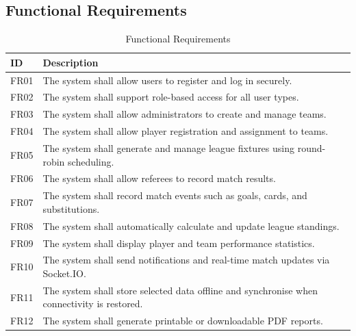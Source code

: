 \documentclass[12pt,a4paper]{report}
\begin{document}
\subsection{Functional Requirements}
\begin{table}[H]
\centering
\caption{Functional Requirements}
\begin{tabular}{p{2.5cm}p{11.5cm}}
\toprule
\textbf{ID} & \textbf{Description}\\
\midrule
FR01 & The system shall allow users to register and log in securely.\\
FR02 & The system shall support role-based access for all user types.\\
FR03 & The system shall allow administrators to create and manage teams.\\
FR04 & The system shall allow player registration and assignment to teams.\\
FR05 & The system shall generate and manage league fixtures using round-robin scheduling.\\
FR06 & The system shall allow referees to record match results.\\
FR07 & The system shall record match events such as goals, cards, and substitutions.\\
FR08 & The system shall automatically calculate and update league standings.\\
FR09 & The system shall display player and team performance statistics.\\
FR10 & The system shall send notifications and real-time match updates via Socket.IO.\\
FR11 & The system shall store selected data offline and synchronise when connectivity is restored.\\
FR12 & The system shall generate printable or downloadable PDF reports.\\
\bottomrule
\end{tabular}
\end{table}
\end{document}
